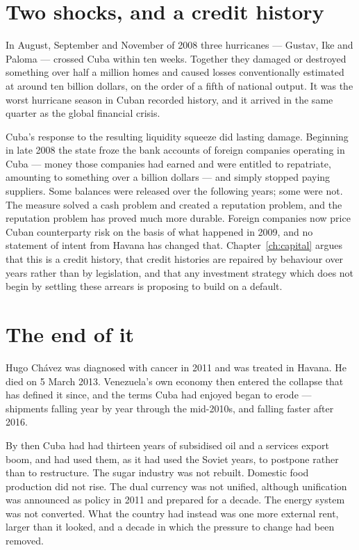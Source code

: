 \section{Two shocks, and a credit history}

In August, September and November of 2008 three hurricanes --- Gustav, Ike and
Paloma --- crossed Cuba within ten weeks. Together they damaged or destroyed
something over half a million homes and caused losses conventionally estimated
at around ten billion dollars, on the order of a fifth of national
output.\unv{} It was the worst hurricane season in Cuban recorded history, and
it arrived in the same quarter as the global financial crisis.

Cuba's response to the resulting liquidity squeeze did lasting damage. Beginning
in late 2008 the state froze the bank accounts of foreign companies operating in
Cuba --- money those companies had earned and were entitled to repatriate,
amounting to something over a billion dollars --- and simply stopped paying
suppliers.\unv{} Some balances were released over the following years; some were
not. The measure solved a cash problem and created a reputation problem, and
the reputation problem has proved much more durable. Foreign companies now price
Cuban counterparty risk on the basis of what happened in 2009, and no statement
of intent from Havana has changed that. Chapter~\ref{ch:capital} argues that
this is a credit history, that credit histories are repaired by behaviour over
years rather than by legislation, and that any investment strategy which does
not begin by settling these arrears is proposing to build on a default.

\section{The end of it}

Hugo Ch\'avez was diagnosed with cancer in 2011 and was treated in Havana. He
died on 5 March 2013. Venezuela's own economy then entered the collapse that has
defined it since, and the terms Cuba had enjoyed began to erode --- shipments
falling year by year through the mid-2010s, and falling faster after 2016.

By then Cuba had had thirteen years of subsidised oil and a services export
boom, and had used them, as it had used the Soviet years, to postpone rather
than to restructure. The sugar industry was not rebuilt. Domestic food
production did not rise. The dual currency was not unified, although unification
was announced as policy in 2011 and prepared for a decade. The energy system was
not converted. What the country had instead was one more external rent, larger
than it looked, and a decade in which the pressure to change had been removed.

